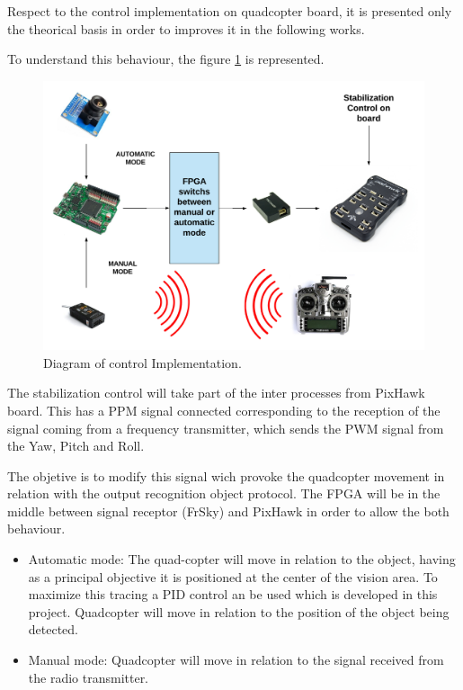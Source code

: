 Respect to the control implementation on quadcopter board, it is presented only the theorical basis in order to improves it in the following works. 

To understand this behaviour, the figure  \ref{fig:control_implemtation} is represented.

\begin{figure}[H]
	\center
	\includegraphics[trim = 0mm 0cm 0mm 0cm, clip,scale=0.4]{imagenes/Cuadricoptero_vision/control_implementation.pdf}
	\caption{Diagram of control Implementation.}
	\label{fig:control_implemtation}
\end{figure}


The stabilization control will take part of the inter processes from PixHawk board. This has a PPM signal connected corresponding to the reception of the signal coming from a frequency transmitter, which sends the PWM signal from the Yaw, Pitch and Roll. \newline

The objetive is to modify this signal wich provoke the quadcopter movement in relation with the output recognition object protocol. The FPGA will be in the middle between signal receptor (FrSky) and PixHawk in order to allow the both behaviour. 

\begin{itemize}
	\item Automatic mode: The quad-copter will move in relation to the object, having as a principal objective it is positioned at the center of the vision area. To maximize this tracing a PID control an be used which is developed in this project. Quadcopter will move in relation to the position of the object being detected.
	\item Manual mode: Quadcopter will move in relation to the signal received from the radio transmitter.
\end{itemize}
